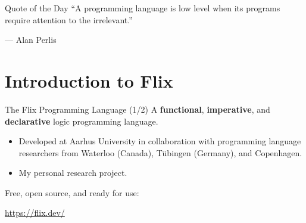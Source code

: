 \begin{frame}{Quote of the Day}
``A programming language is low level when its programs require attention to the irrelevant.''

\begin{flushright}
--- Alan Perlis
\end{flushright}
\end{frame}



\section{Introduction to Flix}

\begin{frame}{The Flix Programming Language (1/2)}
A \textbf{functional}, \textbf{imperative}, and \textbf{declarative} logic
programming language.

\begin{itemize}
    \item Developed at Aarhus University in collaboration with programming
    language researchers from Waterloo (Canada), T\"ubingen (Germany), and
    Copenhagen.
    \item My personal research project. 
\end{itemize}

Free, open source, and ready for use:

\begin{center}
    \url{https://flix.dev/}
\end{center}
\end{frame}

